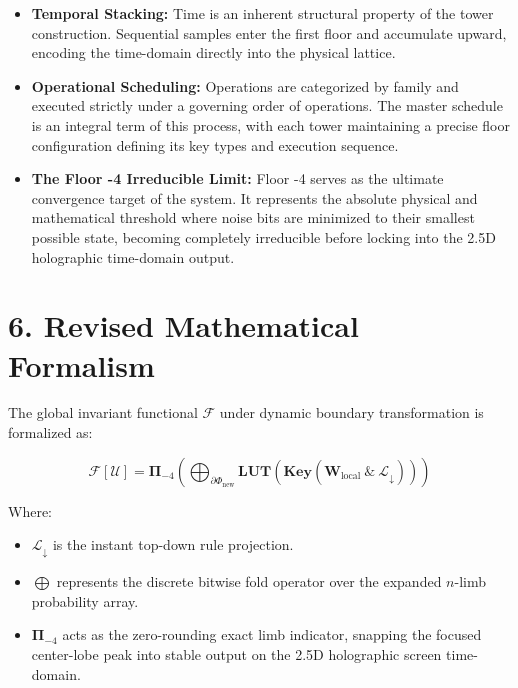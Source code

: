 \begin{itemize}
\item \textbf{Temporal Stacking:} Time is an inherent structural property of the tower construction. Sequential samples enter the first floor and accumulate upward, encoding the time-domain directly into the physical lattice.
\item \textbf{Operational Scheduling:} Operations are categorized by family and executed strictly under a governing order of operations. The master schedule is an integral term of this process, with each tower maintaining a precise floor configuration defining its key types and execution sequence.
\item \textbf{The Floor -4 Irreducible Limit:} Floor -4 serves as the ultimate convergence target of the system. It represents the absolute physical and mathematical threshold where noise bits are minimized to their smallest possible state, becoming completely irreducible before locking into the 2.5D holographic time-domain output.
\end{itemize}

\medskip

\section{\texorpdfstring{6. Revised Mathematical Formalism}{6. Revised Mathematical Formalism}}

The global invariant functional \(\mathcal{F}\) under dynamic boundary transformation is formalized as:

\[
\mathcal{F}[\mathcal{U}] = \mathbf{\Pi}_{-4} \left( \bigoplus_{\partial\Phi_{\text{new}}} \mathbf{LUT}\left( \mathbf{Key}\left( \mathbf{W}_{\text{local}} \ \& \ \mathcal{L}_{\downarrow} \right) \right) \right)
\]

Where:

\begin{itemize}
\item \(\mathcal{L}_{\downarrow}\) is the instant top-down rule projection.
\item \(\bigoplus\) represents the discrete bitwise fold operator over the expanded \(n\)-limb probability array.
\item \(\mathbf{\Pi}_{-4}\) acts as the zero-rounding exact limb indicator, snapping the focused center-lobe peak into stable output on the 2.5D holographic screen time-domain.
\end{itemize}
